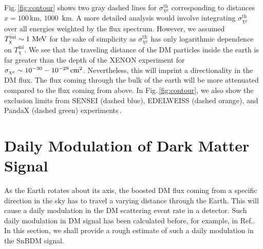 \documentclass[prd,aps,twocolumn,tightenlines,notitlepage,nofootinbib,preprintnumbers,letterpaper,superscriptaddress]{revtex4-2}
\newcommand{\sbdm}{SnBDM }
\newcommand{\cmsq}{{\rm\,cm^2}}
\newcommand{\MeV}{{\rm\ MeV}}
\newcommand{\sce}{\sigma_{\chi e}}
\begin{document}
Fig.\,\ref{fig:contour} shows two gray dashed lines for $\sce^\text{th}$ corresponding to distances $x=100$\,km, $1000$\, km. A more detailed analysis would involve integrating $\sce^\text{th}$ over  all energies weighted by the flux spectrum. However, we assumed $T_\chi^\text{ini} \sim 1\MeV$ for the sake of simplicity as $\sce^\text{th}$ has only logarithmic dependence on $T_\chi^\text{ini}$. We see that the traveling distance of the DM particles inside the earth is far greater than the depth of the XENON experiment for $\sce \sim 10^{-30}-10^{-29}\cmsq$. Nevertheless, this will imprint a directionality in the DM flux. The flux coming through the bulk of the earth will be more attenuated compared to the flux coming from above. In Fig.\,\ref{fig:contour}, we also show the exclusion limits from SENSEI (dashed blue), EDELWEISS (dashed orange), and PandaX (dashed green) experiments\,\cite{Barak:2020fql, Arnaud:2020svb, Jho:2021rmn}.
\section{Daily Modulation of Dark Matter Signal}
As the Earth rotates about its axis, the boosted DM flux coming from a specific direction in the sky has to travel a varying distance through the Earth. This will cause a daily modulation in the DM scattering event rate in a detector. Such daily modulation in DM signal has been calculated before, for example, in Ref.\cite{Kouvaris:2014lpa}. In this section, we shall provide a rough estimate of such a daily modulation in the \sbdm{} signal.
\end{document}
